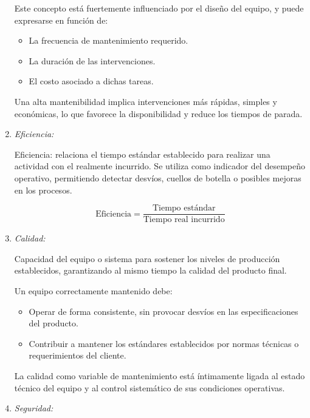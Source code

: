 \documentclass[a4paper,oneside,11pt]{article}
\begin{document}
\begin{enumerate}
    Este concepto está fuertemente influenciado por el diseño del equipo, y puede expresarse en función de:

    \begin{itemize}
        \item La frecuencia de mantenimiento requerido.
        \item La duración de las intervenciones.
        \item El costo asociado a dichas tareas.
    \end{itemize}
    
    Una alta mantenibilidad implica intervenciones más rápidas, simples y económicas, lo que favorece la disponibilidad y reduce los tiempos de parada.

    \item \textit{Eficiencia:}
    
    Eficiencia: relaciona el tiempo estándar establecido para realizar una
    actividad con el realmente incurrido. Se utiliza como indicador del desempeño operativo, permitiendo detectar desvíos, cuellos de botella o posibles mejoras en los procesos.

    \begin{equation*}
        \text{Eficiencia} = \dfrac{\text{Tiempo estándar}}{\text{Tiempo real incurrido}}
    \end{equation*}
    
    \item \textit{Calidad:}

    Capacidad del equipo o sistema para sostener los niveles de producción establecidos, garantizando al mismo tiempo la calidad del producto final.

    Un equipo correctamente mantenido debe:

    \begin{itemize}
        \item Operar de forma consistente, sin provocar desvíos en las especificaciones del producto.
        \item Contribuir a mantener los estándares establecidos por normas técnicas o requerimientos del cliente.
    \end{itemize}

    La calidad como variable de mantenimiento está íntimamente ligada al estado técnico del equipo y al control sistemático de sus condiciones operativas.


    
    \item \textit{Seguridad:}


\end{enumerate}
\end{document}
